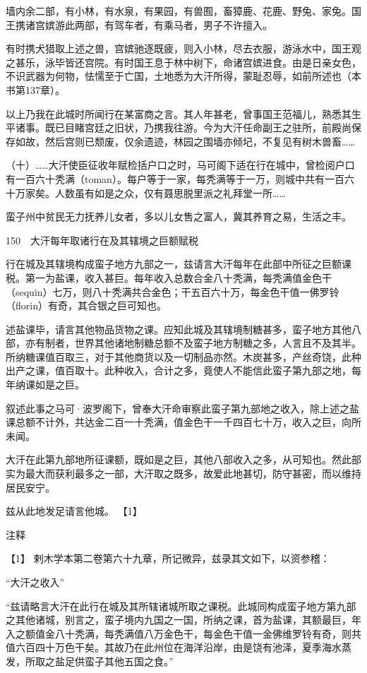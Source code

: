 \documentclass[12pt,UTF8]{ctexbook}
\begin{document}
墙内余二部，有小林，有水泉，有果园，有兽囿，畜獐鹿、花鹿、野兔、家兔。国王携诸宫嫔游此两部，有驾车者，有乘马者，男子不许擅入。

有时携犬猎取上述之兽，宫嫔驰逐既疲，则入小林，尽去衣服，游泳水中，国王观之甚乐，泳毕皆还宫院。有时国王息于林中树下，命诸宫嫔进食。由是日亲女色，不识武器为何物，怯懦至于亡国，土地悉为大汗所得，蒙耻忍辱，如前所述也（本书第137章）。

以上乃我在此城时所闻行在某富商之言。其人年甚老，曾事国王范福儿，熟悉其生平诸事。既已目睹宫廷之旧状，乃携我往游。今为大汗任命副王之驻所，前殿尚保存如故，然后宫则已颓废，仅余遗迹，林园之围墙亦倾圮，不复见有树木兽畜……

（十）……大汗使臣征收年赋检括户口之时，马可阁下适在行在城中，曾检阅户口有一百六十秃满（toman）。每户等于一家，每秃满等于一万，则城中共有一百六十万家矣。人数虽有如是之众，仅有聂思脱里派之礼拜堂一所……

蛮子州中贫民无力抚养儿女者，多以儿女售之富人，冀其养育之易，生活之丰。





150　大汗每年取诸行在及其辖境之巨额赋税

行在城及其辖境构成蛮子地方九部之一，兹请言大汗每年在此部中所征之巨额课税。第一为盐课，收入甚巨。每年收入总数合金八十秃满，每秃满值金色干（sequin）七万，则八十秃满共合金色；干五百六十万，每金色干值一佛罗铃（florin）有奇，其合银之巨可知也。

述盐课毕，请言其他物品货物之课。应知此城及其辖境制糖甚多，蛮子地方其他八部，亦有制者，世界其他诸地制糖总额不及蛮子地方制糖之多，人言且不及其半。所纳糖课值百取三，对于其他商货以及一切制品亦然。木炭甚多，产丝奇饶，此种出产之课，值百取十。此种收入，合计之多，竟使人不能信此蛮子第九部之地，每年纳课如是之巨。

叙述此事之马可·波罗阁下，曾奉大汗命审察此蛮子第九部地之收入，除上述之盐课总额不计外，共达金二百一十秃满，值金色干一千四百七十万，收入之巨，向所未闻。

大汗在此第九部地所征课额，既如是之巨，其他八部收入之多，从可知也。然此部实为最大而获利最多之一部，大汗取之既多，故爱此地甚切，防守甚密，而以维持居民安宁。

兹从此地发足请言他城。 【1】

注释

【1】 剌木学本第二卷第六十九章，所记微异，兹录其文如下，以资参稽：

“大汗之收入”

“兹请略言大汗在此行在城及其所辖诸城所取之课税。此城同构成蛮子地方第九部之其他诸城，别言之，蛮子境内九国之一国，所纳之课，首为盐课，其额最巨，年入之额值金八十秃满，每秃满值八万金色干，每金色干值一金佛维罗铃有奇，则共值六百四十万色干矣。其故乃在此州位在海洋沿岸，由是饶有池泽，夏季海水蒸发，所取之盐足供蛮子其他五国之食。”
\end{document}

